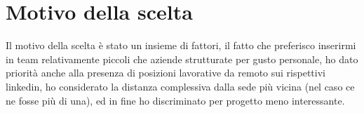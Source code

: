 \section{Motivo della scelta}

Il motivo della scelta è stato un insieme di fattori, 
il fatto che preferisco inserirmi in team relativamente piccoli che aziende strutturate per gusto personale,
ho dato priorità anche alla presenza di posizioni lavorative da remoto sui rispettivi linkedin,
ho considerato la distanza complessiva dalla sede più vicina (nel caso ce ne fosse più di una),
ed in fine ho discriminato per progetto meno interessante.

